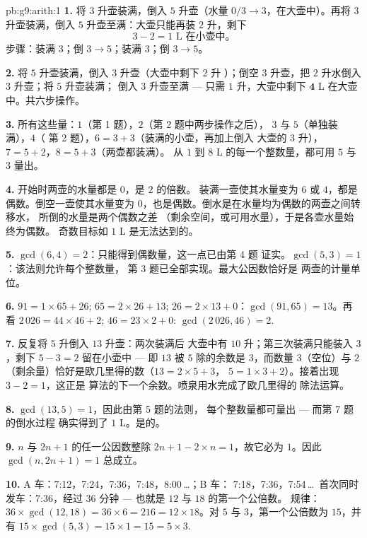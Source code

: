 \begin{solution}{pb:g9:arith:1}
\textbf{1.} 将 $3$ 升壶装满，倒入 $5$ 升壶（水量
$0/3 \to 3$，在大壶中）。再将 $3$ 升壶装满，倒入
$5$ 升壶至满：大壶只能再装 $2$ 升，剩下
\[
3 - 2 = 1 \text{ L 在小壶中。}
\]
步骤：装满 $3$；倒 $3 \to 5$；装满 $3$；倒 $3 \to 5$。

\textbf{2.} 将 $5$ 升壶装满，倒入 $3$ 升壶（大壶中剩下 $2$ 升
）；倒空 $3$ 升壶，把 $2$ 升水倒入 $3$ 升壶；将 $5$ 升壶装满；
倒入 $3$ 升壶至满 --- 只需 $1$ 升，大壶中剩下
$\mathbf{4}$ L 在大壶中。共六步操作。

\textbf{3.} 所有这些量：$1$（第 1 题），$2$（第 2 题中两步操作之后），
$3$ 与 $5$（单独装满），$4$（
第 2 题），$6 = 3 + 3$（装满的小壶，再加上倒入
大壶的 $3$ 升），$7 = 5 + 2$，$8 = 5 + 3$（两壶都装满）。
从 $1$ 到 $8$ L 的每一个整数量，都可用 $5$ 与 $3$ 量出。

\textbf{4.} 开始时两壶的水量都是 $0$，是 $2$ 的倍数。
装满一壶使其水量变为 $6$ 或 $4$，都是偶数。倒空一壶使其水量变为
$0$，也是偶数。倒水是在水量均为偶数的两壶之间转移水，
所倒的水量是两个偶数之差
（剩余空间，或可用水量），于是各壶水量始终为偶数。
奇数目标如 $1$ L 是无法达到的。

\textbf{5.} $\gcd(6, 4) = 2$：只能得到偶数量，这一点已由第 4 题
证实。$\gcd(5, 3) = 1$：该法则允许每个整数量，
第 3 题已全部实现。最大公因数恰好是
两壶的计量单位。

\textbf{6.} $91 = 1 \times 65 + 26$; $65 = 2 \times 26 + 13$;
$26 = 2 \times 13 + 0$：$\gcd(91, 65) = 13$。再看
$2\,026 = 44 \times 46 + 2$; $46 = 23 \times 2 + 0$:
$\gcd(2\,026, 46) = 2$.

\textbf{7.} 反复将 $5$ 升倒入 $13$ 升壶：两次装满后
大壶中有 $10$ 升；第三次装满只能装入
$3$，剩下 $5 - 3 = 2$ 留在小壶中 --- 即
$13$ 被 $5$ 除的余数是 $3$，而数量 $3$（空位）与 $2$
（剩余量）恰好是欧几里得的数（$13 = 2 \times 5 + 3$，
$5 = 1 \times 3 + 2$）。接着出现 $3 - 2 = 1$，这正是
算法的下一个余数。喷泉用水完成了欧几里得的
除法运算。

\textbf{8.} $\gcd(13, 5) = 1$，因此由第 5 题的法则，
每个整数量都可量出 --- 而第 7 题的倒水过程
确实得到了 $1$ L。是的。

\textbf{9.} $n$ 与 $2n + 1$ 的任一公因数整除
$2n + 1 - 2 \times n = 1$，故它必为 $1$。因此
$\gcd(n, 2n+1) = 1$ 总成立。

\textbf{10.} A 车：7:12，7:24，7:36，7:48，8:00\,\dots；B 车：
7:18，7:36，7:54\,\dots\ 首次同时发车：7:36，经过
$36$ 分钟 --- 也就是 $12$ 与 $18$ 的第一个公倍数。
规律：$36 \times \gcd(12, 18) = 36 \times 6 = 216 = 12 \times
18$。对 $5$ 与 $3$，第一个公倍数为 $15$，并有
$15 \times \gcd(5,3) = 15 \times 1 = 15 = 5 \times 3$.


\end{solution}
